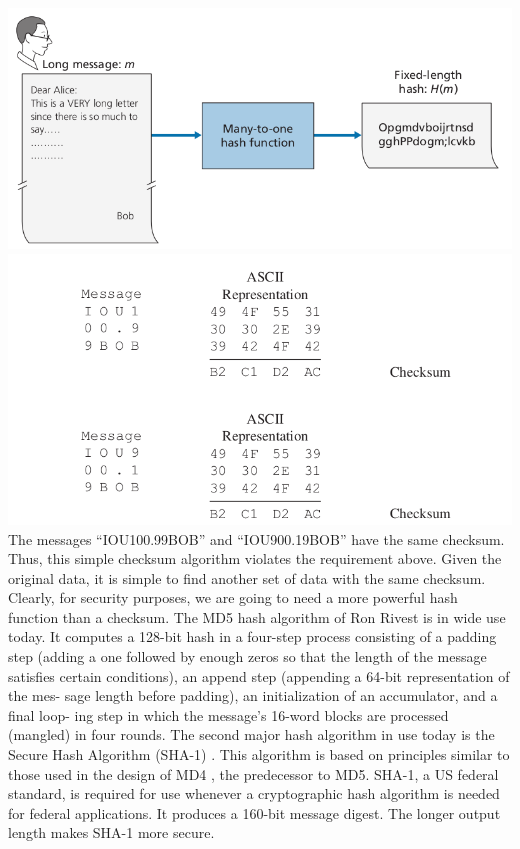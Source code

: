 \documentclass{report}
\theoremstyle{definition}
\begin{document}
{{{\includegraphics[scale=0.5]{hashpic}\newline
\includegraphics[scale=0.5]{checksum}\newline
The messages “IOU100.99BOB” and
“IOU900.19BOB” have the same checksum. Thus, this simple checksum algorithm
violates the requirement above. Given the original data, it is simple to find another
set of data with the same checksum. Clearly, for security purposes, we are going to
need a more powerful hash function than a checksum.
The MD5 hash algorithm of Ron Rivest is in wide use today.
It computes a 128-bit hash in a four-step process consisting of a padding step
(adding a one followed by enough zeros so that the length of the message satisfies
certain conditions), an append step (appending a 64-bit representation of the mes-
sage length before padding), an initialization of an accumulator, and a final loop-
ing step in which the message’s 16-word blocks are processed (mangled) in four
rounds.
The second major hash algorithm in use today is the Secure Hash Algorithm
(SHA-1) . This algorithm is based on principles similar to those used
in the design of MD4 , the predecessor to MD5. SHA-1, a US federal
standard, is required for use whenever a cryptographic hash algorithm is needed for
federal applications. It produces a 160-bit message digest. The longer output length
makes SHA-1 more secure.
}

}}
\end{document}
